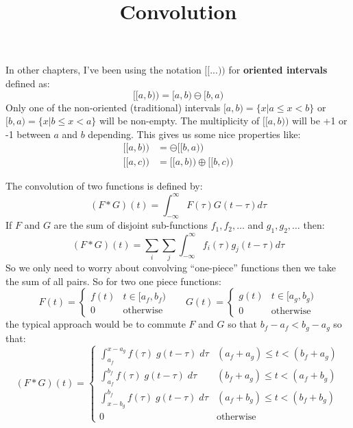 \documentclass{letter}
\title{Convolution}
\begin{document}
	In other chapters, I've been using the notation $[\![ ... )\!)$ for \textbf{oriented intervals} defined as:
	\begin{equation}
		[\![a,b)\!) = [a,b) \ominus [b,a)
	\end{equation}
	Only one of the non-oriented (traditional) intervals  $[a,b) = \{ x | a \leq x < b\}$ or $[b,a) = \{ x | b \leq x < a \}$ 
	will be non-empty.
	The multiplicity of $[\![a,b)\!)$ will be +1 or -1 between $a$ and $b$ depending.
	This gives us some nice properties like:
	\begin{align}
		[\![a,b)\!) &= \ominus [\![b,a)\!) \\
		[\![a,c)\!) &= [\![a,b)\!) \oplus [\![b,c)\!)
	\end{align}


	The convolution of two functions is defined by:
	\begin{equation}
		(F * G)(t) = \int_{-\infty}^\infty F(\tau) G(t-\tau) d\tau
	\end{equation}
	If $F$ and $G$ are the sum of disjoint sub-functions $f_1 , f_2, \ldots$ and $g_1, g_2, \ldots$ then:
	\begin{equation}
		(F * G)(t) = \sum_i \sum_j \int_{-\infty}^\infty f_i(\tau) g_j(t-\tau) d\tau
	\end{equation}
	So we only need to worry about convolving ``one-piece'' functions then we take the sum of all pairs.
	So for two one piece functions:
	\begin{equation*}
		F(t) = \begin{cases}
		f(t) & t \in [a_f,b_f) \\
		0 & \text{otherwise}
		\end{cases}
		\;\;\;\;\;\;
		G(t) = \begin{cases}
		g(t) & t \in [a_g, b_g) \\
		0 & \text{otherwise}
		\end{cases}
	\end{equation*}
	the typical approach would be to commute $F$ and $G$ so that $b_f - a_f < b_g - a_g$ so that:
	\begin{equation}
	(F * G)(t) = 
		\begin{cases}
			\int_{a_f}^{x-a_g} f(\tau) \; g(t-\tau) \; d\tau 	& (a_f+a_g) \leq t < (b_f+a_g) \\
			\int_{a_f}^{b_f} f(\tau) \; g(t-\tau) \; d\tau		& (b_f+a_g) \leq t < (a_f+b_g) \\
			\int_{x-b_g}^{b_f} f(\tau) \; g(t-\tau) \; d\tau	& (a_f+b_g) \leq t < (b_f+b_g) \\
			0											& \text{otherwise}
		\end{cases}
	\end{equation}
	
\end{document}
